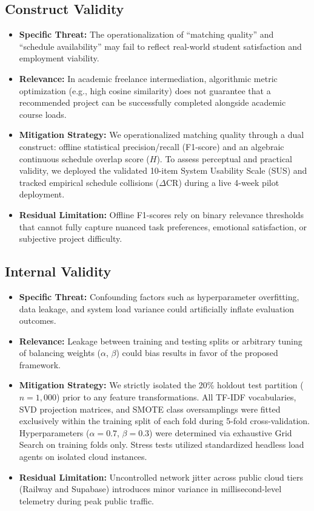 \documentclass[a4paper,fleqn]{cas-dc}
\begin{document}
\subsection{Construct Validity}
\begin{itemize}
    \item \textbf{Specific Threat:} The operationalization of ``matching quality'' and ``schedule availability'' may fail to reflect real-world student satisfaction and employment viability.
    \item \textbf{Relevance:} In academic freelance intermediation, algorithmic metric optimization (e.g., high cosine similarity) does not guarantee that a recommended project can be successfully completed alongside academic course loads.
    \item \textbf{Mitigation Strategy:} We operationalized matching quality through a dual construct: offline statistical precision/recall (F1-score) and an algebraic continuous schedule overlap score ($H$). To assess perceptual and practical validity, we deployed the validated 10-item System Usability Scale (SUS) \cite{bangor2008, brooke1996} and tracked empirical schedule collisions ($\Delta\text{CR}$) during a live 4-week pilot deployment.
    \item \textbf{Residual Limitation:} Offline F1-scores rely on binary relevance thresholds that cannot fully capture nuanced task preferences, emotional satisfaction, or subjective project difficulty.
\end{itemize}

\subsection{Internal Validity}
\begin{itemize}
    \item \textbf{Specific Threat:} Confounding factors such as hyperparameter overfitting, data leakage, and system load variance could artificially inflate evaluation outcomes.
    \item \textbf{Relevance:} Leakage between training and testing splits or arbitrary tuning of balancing weights ($\alpha$, $\beta$) could bias results in favor of the proposed framework.
    \item \textbf{Mitigation Strategy:} We strictly isolated the 20\% holdout test partition ($n = 1,000$) prior to any feature transformations. All TF-IDF vocabularies, SVD projection matrices, and SMOTE class oversamplings were fitted exclusively within the training split of each fold during 5-fold cross-validation. Hyperparameters ($\alpha = 0.7$, $\beta = 0.3$) were determined via exhaustive Grid Search on training folds only. Stress tests utilized standardized headless load agents on isolated cloud instances.
    \item \textbf{Residual Limitation:} Uncontrolled network jitter across public cloud tiers (Railway and Supabase) introduces minor variance in millisecond-level telemetry during peak public traffic.
\end{itemize}
\end{document}
